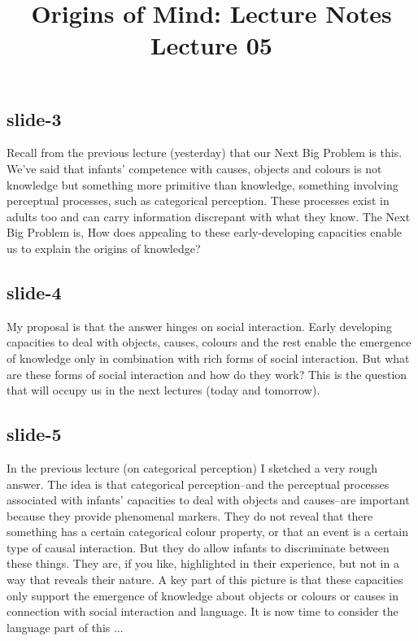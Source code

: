 \documentclass[12pt,\papersize]{extarticle}
\begin{document}
\setlength\footnotesep{1em}









\title {Origins of Mind: Lecture Notes \\ Lecture 05}
 
\maketitle
 
 
\subsection{slide-3}
Recall from the previous lecture (yesterday) that our Next Big Problem is this. We've said that infants' competence with causes, objects and colours is not knowledge but something more primitive than knowledge, something involving perceptual processes, such as categorical perception. These processes exist in adults too and can carry information discrepant with what they know.
The Next Big Problem is, How does appealing to these early-developing capacities enable us to explain the origins of knowledge?
 
 
\subsection{slide-4}
My proposal is that the answer hinges on social interaction. Early developing capacities to deal with objects, causes, colours and the rest enable the emergence of knowledge only in combination with rich forms of social interaction.
But what are these forms of social interaction and how do they work? This is the question that will occupy us in the next lectures (today and tomorrow).
 
 
\subsection{slide-5}
In the previous lecture (on categorical perception) I sketched a very rough answer. The idea is that categorical perception--and the perceptual processes associated with infants' capacities to deal with objects and causes--are important because they provide phenomenal markers. They do not reveal that there something has a certain categorical colour property, or that an event is a certain type of causal interaction. But they do allow infants to discriminate between these things. They are, if you like, highlighted in their experience, but not in a way that reveals their nature.
A key part of this picture is that these capacities only support the emergence of knowledge about objects or colours or causes in connection with social interaction and language. It is now time to consider the language part of this ...
 
\end{document}
